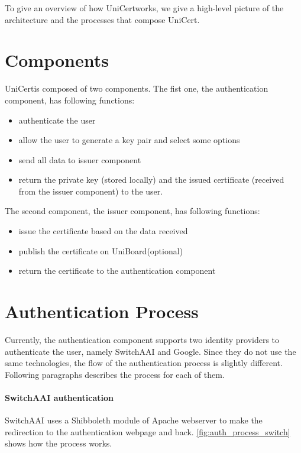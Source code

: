 \documentclass[oneside]{scrreprt}
\newcommand{\uniboard}{\mbox{UniBoard}}
\newcommand{\unicert}{\mbox{UniCert}}
\begin{document}
To give an overview of how \unicert works, we give a high-level picture of the architecture and the processes that compose \unicert.

\section{Components}

\unicert is composed of two components. The fist one, the authentication component, has following functions:
\begin{itemize}
\item authenticate the user
\item allow the user to generate a key pair and select some options
\item send all data to issuer component
\item return the private key (stored locally) and the issued certificate (received from the issuer component) to the user.
\end{itemize}
The second component, the issuer component, has following functions:
\begin{itemize}
\item issue the certificate based on the data received
\item publish the certificate on \uniboard (optional)
\item return the certificate to the authentication component
\end{itemize}

\section{Authentication Process}


Currently, the authentication component supports two identity providers to authenticate the user, namely SwitchAAI and Google. Since they do not use the same technologies, the flow of the authentication process is slightly different. Following paragraphs describes the process for each of them.

\paragraph*{SwitchAAI authentication} SwitchAAI uses a Shibboleth module of Apache webserver to make the redirection to the authentication webpage and back. \cref{fig:auth_process_switch} shows how the process works.
\end{document}
